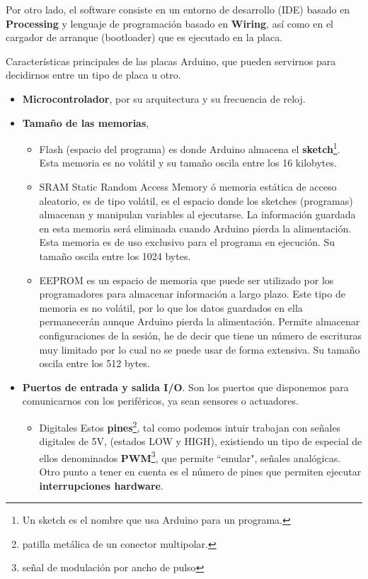 \bigskip
Por otro lado, el software consiste en un entorno de desarrollo (IDE) basado en \textbf{Processing} \cite{Process}  y lenguaje de programación basado en \textbf{Wiring}, así como en el cargador de arranque (bootloader) que es ejecutado en la placa.

Características principales de las placas Arduino, que pueden servirnos para decidirnos entre un tipo de placa u otro.

\begin{itemize}
	\item \textbf{Microcontrolador}, por su arquitectura y su frecuencia de reloj.
	\item \textbf {Tamaño de las memorias},
	\begin{itemize}
		
		\item{Flash} (espacio del programa) es donde Arduino almacena el \textbf{sketch}\footnote{Un sketch es el nombre que usa Arduino para un programa.}. Esta memoria es no volátil y su tamaño oscila entre los 16 kilobytes.
		
		\item{SRAM} Static Random Access Memory ó memoria estática de acceso aleatorio,  es de tipo volátil, es el espacio donde los sketches (programas) almacenan y manipulan variables al ejecutarse. La información guardada en esta memoria será eliminada cuando Arduino pierda la alimentación. Esta memoria es de uso exclusivo para el programa en ejecución. Su tamaño oscila entre los 1024 bytes.
		
		\item{EEPROM} es un espacio de memoria que puede ser utilizado por los programadores para almacenar información a largo plazo. Este tipo de memoria es no volátil, por lo que los datos guardados en ella permanecerán aunque Arduino pierda la alimentación. Permite almacenar configuraciones de la sesión, he de decir que tiene un número de escrituras muy limitado por lo cual no se puede usar de forma extensiva. Su tamaño oscila entre los 512 bytes.
		
	\end{itemize}
	\item \textbf {Puertos de entrada y salida I/O}. Son los puertos que disponemos para comunicarnos con los periféricos, ya sean sensores o actuadores. 
	\begin{itemize}
		\item{Digitales} Estos \textbf{pines}\footnote{patilla metálica de un conector multipolar.}, tal como podemos intuir trabajan con señales digitales de 5V, (estados LOW y HIGH), existiendo un tipo de especial de ellos denominados \textbf{PWM}\footnote{señal de modulación por ancho de pulso}, que permite ``emular", señales analógicas. \newline
		Otro punto a tener en cuenta es el número de pines que permiten ejecutar  \textbf{interrupciones hardware}. 
		

\end{itemize}
\end{itemize}
